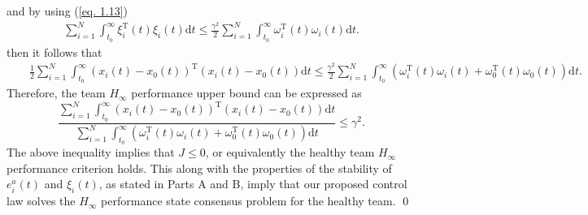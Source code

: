 \documentclass[12pt,draftcls,onecolumn]{IEEEtran}
\begin{document}
and by using  (\ref{eq. 1.13})
\begin{eqnarray*}
\sum_{i=1}^N\int_{t_0}^\infty\xi_i^\text{T}(t)\xi_i(t)\text{d}t\leq\frac{\gamma^2}{2}\sum_{i=1}^N\int_{t_0}^\infty\omega_i^\text{T}(t)\omega_i(t)\text{d}t.
\end{eqnarray*}
then it follows that 
\begin{eqnarray*}
	&&\frac{1}{2}\sum_{i=1}^N\int_{t_0}^{\infty}(x_i(t)-x_0(t))^{\text{T}}(x_i(t)-x_0(t))\text{d}t\leq
	\frac{\gamma^2}{2}{\sum_{i=1}^N\int_{t_0}^{\infty}(\omega_i^{\text{T}}(t)\omega_i(t)+\omega_0^{\text{T}}(t)\omega_0(t))\text{d}t}.
\end{eqnarray*}
Therefore, the team $H_{\infty}$ performance upper bound can be expressed as
\begin{equation*}
\frac{\sum_{i=1}^N\int_{t_0}^{\infty}(x_i(t)-x_0(t))^{\text{T}}(x_i(t)-x_0(t))\text{d}t}{\sum_{i=1}^N\int_{t_0}^{\infty}(\omega_i^{\text{T}}(t)\omega_i(t)+\omega_0^{\text{T}}(t)\omega_0(t))\text{d}t}\leq \gamma^2.\label{eq. 1.14}
\end{equation*}
The above inequality implies that $J\leq 0$, or equivalently the healthy team $H_{\infty}$ performance criterion holds. This along with the  properties of the stability of $e_i^a(t)$ and $\xi_i(t)$, as stated in Parts A and B, imply that our proposed control law solves the $H_{\infty}$ performance state consensus problem for the healthy team. \qed
\end{document}
